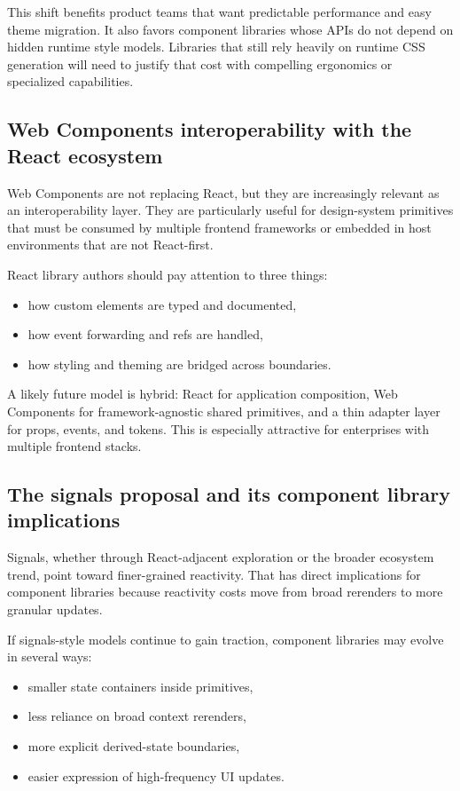This shift benefits product teams that want predictable performance and easy theme migration. It also favors component libraries whose APIs do not depend on hidden runtime style models. Libraries that still rely heavily on runtime CSS generation will need to justify that cost with compelling ergonomics or specialized capabilities.

\subsection{Web Components interoperability with the React ecosystem}
Web Components are not replacing React, but they are increasingly relevant as an interoperability layer. They are particularly useful for design-system primitives that must be consumed by multiple frontend frameworks or embedded in host environments that are not React-first.

React library authors should pay attention to three things:

\begin{itemize}[leftmargin=*, itemsep=0.35em]
  \item how custom elements are typed and documented,
  \item how event forwarding and refs are handled,
  \item how styling and theming are bridged across boundaries.
\end{itemize}

A likely future model is hybrid: React for application composition, Web Components for framework-agnostic shared primitives, and a thin adapter layer for props, events, and tokens. This is especially attractive for enterprises with multiple frontend stacks.

\subsection{The signals proposal and its component library implications}
Signals, whether through React-adjacent exploration or the broader ecosystem trend, point toward finer-grained reactivity. That has direct implications for component libraries because reactivity costs move from broad rerenders to more granular updates.

If signals-style models continue to gain traction, component libraries may evolve in several ways:

\begin{itemize}[leftmargin=*, itemsep=0.35em]
  \item smaller state containers inside primitives,
  \item less reliance on broad context rerenders,
  \item more explicit derived-state boundaries,
  \item easier expression of high-frequency UI updates.
\end{itemize}

